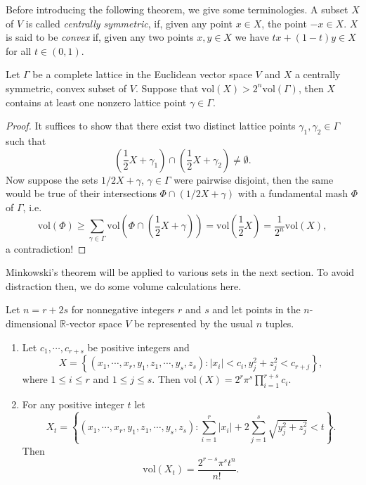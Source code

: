Before introducing the following theorem, we give some terminologies. A subset $X$ of $V$ is called \textit{centrally symmetric}, if, given any point $x\in X$, the point $-x\in X$. $X$ is said to be \textit{convex} if, given any two points $x,y\in X$ we have $tx+(1-t)y\in X$ for all $t\in (0,1)$.
\begin{theorem}
Let $\Gamma$ be a complete lattice in the Euclidean vector space $V$ and $X$ a centrally symmetric, convex subset of $V$. Suppose that $\mathrm{vol}(X)>2^n\mathrm{vol}(\Gamma)$, then $X$ contains at least one nonzero lattice point $\gamma\in\Gamma$.
\end{theorem}
\begin{proof}
It suffices to show that there exist two distinct lattice points $\gamma_1,\gamma_2\in\Gamma$ such that 
$$
\left( \frac{1}{2}X+\gamma _1 \right) \cap \left( \frac{1}{2}X+\gamma _2 \right) \ne \emptyset .
$$
Now suppose the sets $1/2X+\gamma$, $\gamma\in\Gamma$ were pairwise disjoint, then the same would be true of their intersections $\Phi\cap(1/2X+\gamma)$ with a fundamental mash $\Phi$ of $\Gamma$, i.e. 
$$
\mathrm{vol}\left( \Phi \right) \ge \sum_{\gamma \in \Gamma}{\mathrm{vol}\left( \Phi \cap \left( \frac{1}{2}X+\gamma \right) \right)}=\mathrm{vol}\left( \frac{1}{2}X \right) =\frac{1}{2^n}\mathrm{vol}\left( X \right) ,
$$
a contradiction!
\end{proof}
Minkowski's theorem will be applied to various sets in the next section. To avoid distraction then, we do some volume calculations here.
\begin{proposition}
Let $n=r+2s$ for nonnegative integers $r$ and $s$ and let points in the $n$-dimensional $\mathbb{R}$-vector space $V$ be represented by the usual $n$ tuples.
\begin{enumerate}
    \item Let $c_1,\cdots,c_{r+s}$ be positive integers and 
    $$
    X=\left\{ \left( x_1,\cdots ,x_r,y_1,z_1,\cdots ,y_s,z_s \right) :\left| x_i \right|<c_i,y_{j}^{2}+z_{j}^{2}<c_{r+j} \right\} ,
    $$
    where $1\le i\le r$ and $1\le j\le s$. Then $\mathrm{vol}(X)=2^r\pi^s\prod_{i=1}^{r+s}c_i$.
    \item For any positive integer $t$ let 
    $$
    X_t=\left\{ \left( x_1,\cdots ,x_r,y_1,z_1,\cdots ,y_s,z_s \right) :\sum_{i=1}^r{\left| x_i \right|}+2\sum_{j=1}^s{\sqrt{y_{j}^{2}+z_{j}^{2}}}<t \right\} .
    $$
    Then 
    $$
    \mathrm{vol}\left( X_t \right) =\frac{2^{r-s}\pi ^st^n}{n!}.
    $$
\end{enumerate}
\end{proposition}
